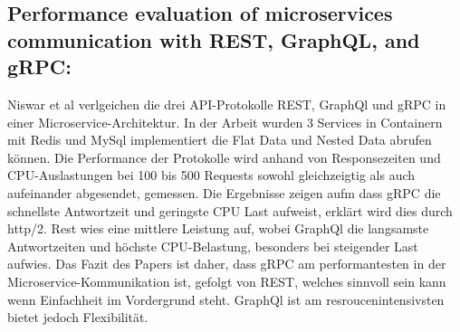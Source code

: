 \subsection{Performance evaluation of microservices communication with REST, GraphQL, and gRPC:}
Niswar et al verlgeichen die drei API-Protokolle REST, GraphQl und gRPC in einer Microservice-Architektur. In der Arbeit wurden 3 Services in Containern mit Redis und MySql implementiert die Flat Data und Nested Data abrufen können. Die Performance der Protokolle wird anhand von Responsezeiten und CPU-Auslastungen bei 100 bis 500 Requests sowohl gleichzeigtig als auch aufeinander abgesendet, gemessen.
Die Ergebnisse zeigen aufm dass gRPC die schnellste Antwortzeit und geringste CPU Last aufweist, erklärt wird dies durch http/2.
Rest wies eine mittlere Leistung auf, wobei GraphQl die langsamste Antwortzeiten und höchste CPU-Belastung, besonders bei steigender Last aufwies. Das Fazit des Papers ist daher, dass gRPC am performantesten in der Microservice-Kommunikation ist, gefolgt von REST, welches sinnvoll sein kann wenn Einfachheit im Vordergrund steht. GraphQl ist am resroucenintensivsten bietet jedoch Flexibilität.



\chapterend